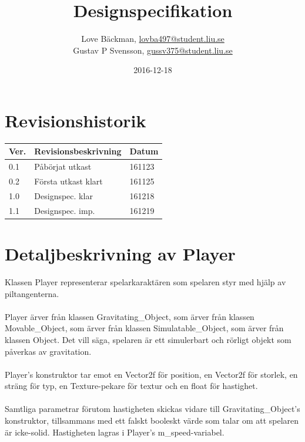 \documentclass{TDP003mall}
\author{Love Bäckman, \url{lovba497@student.liu.se} \\
    Gustav P Svensson, \url{gussv375@student.liu.se}}
\title{Designspecifikation}
\date{2016-12-18}
\begin{document}
\projectpage

\tableofcontents
\newpage

\section{Revisionshistorik}
\begin{table}[!h]
\begin{tabularx}{\linewidth}{|l|X|l|}
\hline
Ver. & Revisionsbeskrivning & Datum \\\hline
0.1 & Påbörjat utkast & 161123 \\\hline
0.2 & Första utkast klart & 161125 \\\hline
1.0 & Designspec. klar & 161218 \\\hline
1.1 & Designspec. imp. & 161219 \\\hline
\end{tabularx}
\end{table}

\section{Detaljbeskrivning av Player}
Klassen Player representerar spelarkaraktären som spelaren styr med hjälp av piltangenterna.
\\\\
Player ärver från klassen Gravitating\_Object, som ärver från klassen Movable\_Object, som ärver från klassen Simulatable\_Object, som ärver från klassen Object. Det vill säga, spelaren är ett simulerbart och rörligt objekt som påverkas av gravitation.
\\\\
Player's konstruktor tar emot en Vector2f för position, en Vector2f för storlek, en sträng för typ, en Texture-pekare för textur och en float för hastighet.
\\\\
Samtliga parametrar förutom hastigheten skickas vidare till Gravitating\_Object's konstruktor, tillsammans med ett falskt booleskt värde som talar om att spelaren är icke-solid. Hastigheten lagras i Player's m\_speed-variabel.
\end{document}
